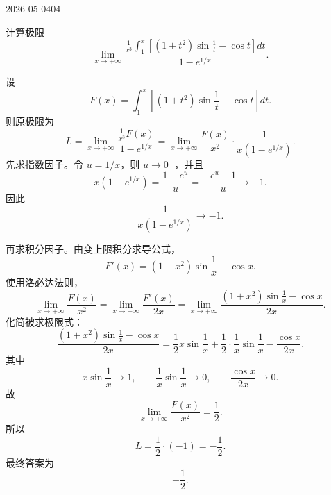 \begin{mistake}{2026-05-04}{04}

\begin{problemcontent}
计算极限
\[
\lim_{x\to+\infty}
\frac{\frac{1}{x^3}\int_1^x\left[\left(1+t^2\right)\sin\frac{1}{t}-\cos t\right]dt}{1-e^{1/x}}.
\]
\end{problemcontent}

\begin{solutioncontent}
设
\[
F(x)=\int_1^x\left[\left(1+t^2\right)\sin\frac{1}{t}-\cos t\right]dt.
\]
则原极限为
\[
L=\lim_{x\to+\infty}\frac{\frac{1}{x^3}F(x)}{1-e^{1/x}}
=\lim_{x\to+\infty}\frac{F(x)}{x^2}\cdot\frac{1}{x\left(1-e^{1/x}\right)}.
\]
先求指数因子。令 \(u=1/x\)，则 \(u\to0^+\)，并且
\[
x\left(1-e^{1/x}\right)=\frac{1-e^u}{u}=-\frac{e^u-1}{u}\to -1.
\]
因此
\[
\frac{1}{x\left(1-e^{1/x}\right)}\to -1.
\]

再求积分因子。由变上限积分求导公式，
\[
F'(x)=\left(1+x^2\right)\sin\frac{1}{x}-\cos x.
\]
使用洛必达法则，
\[
\lim_{x\to+\infty}\frac{F(x)}{x^2}
=\lim_{x\to+\infty}\frac{F'(x)}{2x}
=\lim_{x\to+\infty}\frac{\left(1+x^2\right)\sin\frac{1}{x}-\cos x}{2x}.
\]
化简被求极限式：
\[
\frac{\left(1+x^2\right)\sin\frac{1}{x}-\cos x}{2x}
=\frac12 x\sin\frac{1}{x}+\frac12\cdot\frac{1}{x}\sin\frac{1}{x}-\frac{\cos x}{2x}.
\]
其中
\[
x\sin\frac{1}{x}\to1,\qquad \frac{1}{x}\sin\frac{1}{x}\to0,\qquad \frac{\cos x}{2x}\to0.
\]
故
\[
\lim_{x\to+\infty}\frac{F(x)}{x^2}=\frac12.
\]
所以
\[
L=\frac12\cdot(-1)=-\frac12.
\]
最终答案为
\[
\boxed{-\frac12}.
\]
\end{solutioncontent}


\end{mistake}
